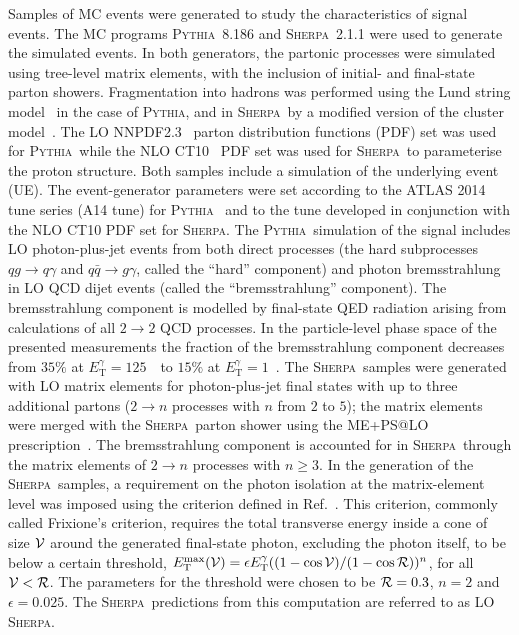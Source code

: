 \documentclass[cernpreprint,texlive=2016,txfonts,UKenglish]{latex/atlasdoc}
\def\etg{E_{\mathrm{T}}^{\gamma}}
\def\qq{q\bar q}
\def\sher{{\textsc{Sherpa}}}
\def\pyt{{\textsc{Pythia}}}
\begin{document}
Samples of MC events were generated to study the characteristics of
signal events. The MC programs \pyt~8.186 and \sher~2.1.1 were used to
generate the simulated events. In both generators, the partonic
processes were simulated using tree-level matrix elements, with the
inclusion of initial- and final-state parton showers. Fragmentation
into hadrons was performed using the Lund string
model~\cite{prep:97:31} in the case of  \pyt, and in \sher\ by a
modified version of the cluster model~\cite{epj:c36:381}. The LO
NNPDF2.3~\cite{np:b867:244} parton distribution functions (PDF) set
was  used for \pyt\ while the NLO CT10~\cite{pr:d82:074024} PDF set
was used for \sher\ to parameterise the proton structure. Both samples
include a simulation of the underlying event (UE). The event-generator
parameters were set according to the ATLAS  2014 tune series (A14
tune) for \pyt~\cite{ATL-PHYS-PUB-2014-021} and to the tune developed
in conjunction with the NLO CT10 PDF set for \sher. The \pyt\
simulation of the signal includes LO photon-plus-jet events from both
direct processes (the hard subprocesses  $qg\rightarrow q\gamma$ and
$\qq\rightarrow g\gamma$, called the ``hard'' component) and photon
bremsstrahlung in LO QCD dijet events (called the ``bremsstrahlung''
component). The bremsstrahlung component is modelled by final-state
QED radiation arising from calculations of all $2\rightarrow 2$ QCD
processes. In the particle-level phase space of the presented
measurements the fraction of the bremsstrahlung component decreases
from $35\%$ at $\etg=125$~\GeV\ to $15\%$ at $\etg=1$~\TeV. The \sher\
samples were generated with LO matrix elements for photon-plus-jet
final states with up to three additional partons ($2\rightarrow n$
processes with $n$ from $2$ to $5$); the matrix elements were merged
with the \sher\ parton shower using the ME+PS@LO
prescription~\cite{jhep:0905:053}. The bremsstrahlung component is
accounted for in \sher\ through the matrix elements of $2\rightarrow
n$ processes with $n\geq 3$. In the generation of the \sher\ samples,
a requirement on the photon isolation at the matrix-element level was
imposed using the criterion defined in Ref.~\cite{pl:b429:369}. This
criterion, commonly called Frixione's criterion, requires the total
transverse energy inside a cone of size ${\cal V}$ around the
generated final-state photon, excluding the photon itself, to be below
a certain threshold,
$E_{\mathrm{T}}^{\mathrm{max}}({\cal V})=\epsilon\etg ((1-\cos{{\cal V}})/(1-\cos{{\cal R}}))^{n}$,
for all ${\cal V} < {\cal R}$. The parameters for the threshold were
chosen to be ${\cal R}=0.3$, $n=2$ and $\epsilon=0.025$. The \sher\
predictions from this computation are referred to as LO \sher. 
\end{document}
